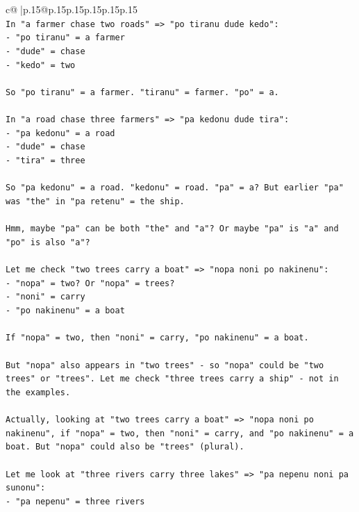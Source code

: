 \documentclass{article}
\begin{document}
{\begin{supertabular}{c@{$\;$}|p{.15\linewidth}@{}p{.15\linewidth}p{.15\linewidth}p{.15\linewidth}p{.15\linewidth}p{.15\linewidth}}
{{{\\ 
\texttt{In "a farmer chase two roads" => "po tiranu dude kedo":} \\
\texttt{{-} "po tiranu" = a farmer} \\
\texttt{{-} "dude" = chase} \\
\texttt{{-} "kedo" = two} \\
\\ 
\texttt{So "po tiranu" = a farmer. "tiranu" = farmer. "po" = a.} \\
\\ 
\texttt{In "a road chase three farmers" => "pa kedonu dude tira":} \\
\texttt{{-} "pa kedonu" = a road} \\
\texttt{{-} "dude" = chase} \\
\texttt{{-} "tira" = three} \\
\\ 
\texttt{So "pa kedonu" = a road. "kedonu" = road. "pa" = a? But earlier "pa" was "the" in "pa retenu" = the ship.} \\
\\ 
\texttt{Hmm, maybe "pa" can be both "the" and "a"? Or maybe "pa" is "a" and "po" is also "a"?} \\
\\ 
\texttt{Let me check "two trees carry a boat" => "nopa noni po nakinenu":} \\
\texttt{{-} "nopa" = two? Or "nopa" = trees?} \\
\texttt{{-} "noni" = carry} \\
\texttt{{-} "po nakinenu" = a boat} \\
\\ 
\texttt{If "nopa" = two, then "noni" = carry, "po nakinenu" = a boat.} \\
\\ 
\texttt{But "nopa" also appears in "two trees" {-} so "nopa" could be "two trees" or "trees". Let me check "three trees carry a ship" {-} not in the examples.} \\
\\ 
\texttt{Actually, looking at "two trees carry a boat" => "nopa noni po nakinenu", if "nopa" = two, then "noni" = carry, and "po nakinenu" = a boat. But "nopa" could also be "trees" (plural).} \\
\\ 
\texttt{Let me look at "three rivers carry three lakes" => "pa nepenu noni pa sunonu":} \\
\texttt{{-} "pa nepenu" = three rivers} \\
}}}
\end{supertabular}}
\end{document}
